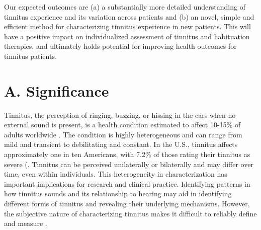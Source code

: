 \documentclass[11pt, notitlepage]{article} %
\begin{document}
Our expected outcomes are (a) a substantially more detailed understanding of tinnitus experience and its variation across patients and (b) an novel, simple and efficient method for characterizing tinnitus experience in new patients. This will have a positive impact on individualized assessment of tinnitus and habituation therapies, and ultimately holds potential for improving health outcomes for tinnitus patients.


\newpage

\section*{A. Significance}

Tinnitus, the perception of ringing, buzzing, or hissing in the ears when no external sound is present,
is a health condition estimated to affect 10-15\% of adults worldwide \cite{henryTinnitusEpidemiologicPerspective2020}.
The condition is highly heterogeneous and can range from mild and transient to debilitating and constant.
In the U.S., tinnitus affects approximately one in ten Americans, with 7.2\% of those rating their tinnitus as severe (\cite{bhattPrevalenceSeverityExposures2016}.
Tinnitus can be perceived unilaterally or bilaterally and may differ over time, even within individuals.
This heterogeneity in characterization has important implications for research
and clinical practice.
Identifying patterns in how tinnitus sounds and its relationship to hearing may aid in identifying
different forms of tinnitus and revealing their underlying mechanisms.
However, the subjective nature of characterizing tinnitus makes it difficult
to reliably define and measure \cite{vajsakovicPrinciplesMethodsPsychoacoustic2021}.
\end{document}
